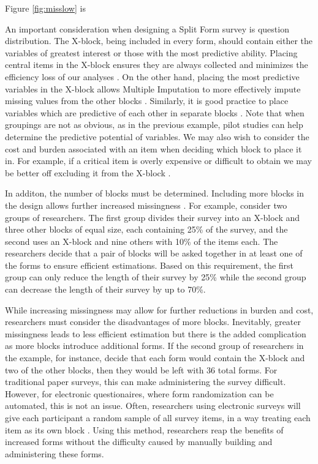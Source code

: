 \documentclass{svjour3}                     %
\begin{document}
Figure \ref{fig:misslow} is 


An important consideration when designing a Split Form survey is question distribution. The X-block, being included in every form, should contain either the variables of greatest interest or those with the most predictive ability.
Placing central items in the X-block ensures they are always collected and minimizes the efficiency loss of our analyses \citep{thomas2006evaluation}. On the other hand, placing the most predictive variables in the X-block allows Multiple Imputation to more effectively impute missing values from the other blocks \citep{gottschall2012comparison}. Similarly, it is good practice to place variables which are predictive of each other in separate blocks \citep{gottschall2012comparison}. Note that when groupings are not as obvious, as in the previous example, pilot studies can help determine the predictive potential of variables. We may also wish to consider the cost and burden associated with an item when deciding which block to place it in. For example, if a critical item is overly expensive or difficult to obtain we may be better off excluding it from the X-block \citep{little2013planned}. \par

In additon, the number of blocks must be determined. Including more blocks in the design allows further increased missingness \citep{graham2006planned}. For example, consider two groups of researchers. The first group divides their survey into an X-block and three other blocks of equal size, each containing 25\% of the survey, and the second uses an X-block and nine others with 10\% of the items each. The researchers decide that a pair of blocks will be asked together in at least one of the forms to ensure efficient estimations. Based on this requirement, the first group can only reduce the length of their survey by 25\% while the second group can decrease the length of their survey by up to 70\%. \par

While increasing missingness may allow for further reductions in burden and cost, researchers must consider the disadvantages of more blocks. Inevitably, greater missingness leads to less efficient estimation \citep{rhemtulla2016asymptotic} but there is the added complication as more blocks introduce additional forms. If the second group of researchers in the example, for instance, decide that each form would contain the X-block and two of the other blocks, then they would be left with 36 total forms. For traditional paper surveys, this can make administering the survey difficult. However, for electronic questionaires, where form randomization can be automated, this is not an issue. Often, researchers using electronic surveys will give each participant a random sample of all survey items, in a way treating each item as its own block \citep{silvia2014planned}. Using this method, researchers reap the benefits of increased forms without the difficulty caused by manually building and administering these forms. \par
\end{document}
